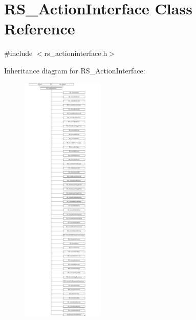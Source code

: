 \hypertarget{classRS__ActionInterface}{\section{R\-S\-\_\-\-Action\-Interface Class Reference}
\label{classRS__ActionInterface}
}


{\ttfamily \#include $<$rs\-\_\-actioninterface.\-h$>$}

Inheritance diagram for R\-S\-\_\-\-Action\-Interface\-:\begin{figure}[H]
\begin{center}
\leavevmode
\includegraphics[height=12.000000cm]{classRS__ActionInterface}
\end{center}
\end{figure}
